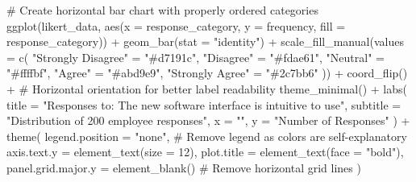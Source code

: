 \documentclass[
  letterpaper,
  DIV=11,
  numbers=noendperiod]{scrartcl}
\newenvironment{Shaded}{\begin{snugshade}}{\end{snugshade}}
\newcommand{\AttributeTok}[1]{\textcolor[rgb]{0.40,0.45,0.13}{#1}}
\newcommand{\CommentTok}[1]{\textcolor[rgb]{0.37,0.37,0.37}{#1}}
\newcommand{\DecValTok}[1]{\textcolor[rgb]{0.68,0.00,0.00}{#1}}
\newcommand{\FunctionTok}[1]{\textcolor[rgb]{0.28,0.35,0.67}{#1}}
\newcommand{\NormalTok}[1]{\textcolor[rgb]{0.00,0.23,0.31}{#1}}
\newcommand{\OtherTok}[1]{\textcolor[rgb]{0.00,0.23,0.31}{#1}}
\newcommand{\SpecialCharTok}[1]{\textcolor[rgb]{0.37,0.37,0.37}{#1}}
\newcommand{\StringTok}[1]{\textcolor[rgb]{0.13,0.47,0.30}{#1}}
\begin{document}
\begin{Shaded}
\begin{Highlighting}[]
\CommentTok{\# Create horizontal bar chart with properly ordered categories}
\FunctionTok{ggplot}\NormalTok{(likert\_data, }\FunctionTok{aes}\NormalTok{(}\AttributeTok{x =}\NormalTok{ response\_category,}
                        \AttributeTok{y =}\NormalTok{ frequency, }
                        \AttributeTok{fill =}\NormalTok{ response\_category)) }\SpecialCharTok{+}
  \FunctionTok{geom\_bar}\NormalTok{(}\AttributeTok{stat =} \StringTok{"identity"}\NormalTok{) }\SpecialCharTok{+}
  \FunctionTok{scale\_fill\_manual}\NormalTok{(}\AttributeTok{values =} \FunctionTok{c}\NormalTok{(}
    \StringTok{"Strongly Disagree"} \OtherTok{=} \StringTok{"\#d7191c"}\NormalTok{,}
    \StringTok{"Disagree"} \OtherTok{=} \StringTok{"\#fdae61"}\NormalTok{,}
    \StringTok{"Neutral"} \OtherTok{=} \StringTok{"\#ffffbf"}\NormalTok{,}
    \StringTok{"Agree"} \OtherTok{=} \StringTok{"\#abd9e9"}\NormalTok{,}
    \StringTok{"Strongly Agree"} \OtherTok{=} \StringTok{"\#2c7bb6"}
\NormalTok{  )) }\SpecialCharTok{+}
  \FunctionTok{coord\_flip}\NormalTok{() }\SpecialCharTok{+}  \CommentTok{\# Horizontal orientation for better label readability}
  \FunctionTok{theme\_minimal}\NormalTok{() }\SpecialCharTok{+}
  \FunctionTok{labs}\NormalTok{(}
    \AttributeTok{title =} \StringTok{"Responses to: \textquotesingle{}The new software }
\StringTok{    interface is intuitive to use\textquotesingle{}"}\NormalTok{,}
    \AttributeTok{subtitle =} \StringTok{"Distribution of 200 employee responses"}\NormalTok{,}
    \AttributeTok{x =} \StringTok{""}\NormalTok{,}
    \AttributeTok{y =} \StringTok{"Number of Responses"}
\NormalTok{  ) }\SpecialCharTok{+}
  \FunctionTok{theme}\NormalTok{(}
    \AttributeTok{legend.position =} \StringTok{"none"}\NormalTok{,  }\CommentTok{\# Remove legend as colors are self{-}explanatory}
    \AttributeTok{axis.text.y =} \FunctionTok{element\_text}\NormalTok{(}\AttributeTok{size =} \DecValTok{12}\NormalTok{),}
    \AttributeTok{plot.title =} \FunctionTok{element\_text}\NormalTok{(}\AttributeTok{face =} \StringTok{"bold"}\NormalTok{),}
    \AttributeTok{panel.grid.major.y =} \FunctionTok{element\_blank}\NormalTok{()  }\CommentTok{\# Remove horizontal grid lines}
\NormalTok{  )}
\end{Highlighting}
\end{Shaded}
\end{document}
